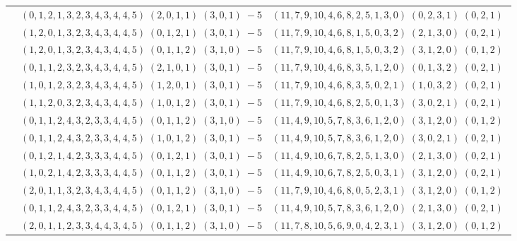 \documentclass[11pt]{article}
\begin{document}
\begin{longtable}[l]{|c|c|c|}
 \cline{2-3} 
 & $(0 ,1 ,2 ,1 ,3 ,2 ,3 ,4 ,3 ,4 ,4 ,5) \;(2 ,0 ,1 ,1) \;(3 ,0 ,1) \;-5$ & $(11 ,7 ,9 ,10 ,4 ,6 ,8 ,2 ,5 ,1 ,3 ,0) \;(0 ,2 ,3 ,1) \;(0 ,2 ,1) \;$\\ 
 \cline{2-3} 
 & $(1 ,2 ,0 ,1 ,3 ,2 ,3 ,4 ,3 ,4 ,4 ,5) \;(0 ,1 ,2 ,1) \;(3 ,0 ,1) \;-5$ & $(11 ,7 ,9 ,10 ,4 ,6 ,8 ,1 ,5 ,0 ,3 ,2) \;(2 ,1 ,3 ,0) \;(0 ,2 ,1) \;$\\ 
 \cline{2-3} 
 & $(1 ,2 ,0 ,1 ,3 ,2 ,3 ,4 ,3 ,4 ,4 ,5) \;(0 ,1 ,1 ,2) \;(3 ,1 ,0) \;-5$ & $(11 ,7 ,9 ,10 ,4 ,6 ,8 ,1 ,5 ,0 ,3 ,2) \;(3 ,1 ,2 ,0) \;(0 ,1 ,2) \;$\\ 
 \cline{2-3} 
 & $(0 ,1 ,1 ,2 ,3 ,2 ,3 ,4 ,3 ,4 ,4 ,5) \;(2 ,1 ,0 ,1) \;(3 ,0 ,1) \;-5$ & $(11 ,7 ,9 ,10 ,4 ,6 ,8 ,3 ,5 ,1 ,2 ,0) \;(0 ,1 ,3 ,2) \;(0 ,2 ,1) \;$\\ 
 \cline{2-3} 
 & $(1 ,0 ,1 ,2 ,3 ,2 ,3 ,4 ,3 ,4 ,4 ,5) \;(1 ,2 ,0 ,1) \;(3 ,0 ,1) \;-5$ & $(11 ,7 ,9 ,10 ,4 ,6 ,8 ,3 ,5 ,0 ,2 ,1) \;(1 ,0 ,3 ,2) \;(0 ,2 ,1) \;$\\ 
 \cline{2-3} 
 & $(1 ,1 ,2 ,0 ,3 ,2 ,3 ,4 ,3 ,4 ,4 ,5) \;(1 ,0 ,1 ,2) \;(3 ,0 ,1) \;-5$ & $(11 ,7 ,9 ,10 ,4 ,6 ,8 ,2 ,5 ,0 ,1 ,3) \;(3 ,0 ,2 ,1) \;(0 ,2 ,1) \;$\\ 
 \cline{2-3} 
 & $(0 ,1 ,1 ,2 ,4 ,3 ,2 ,3 ,3 ,4 ,4 ,5) \;(0 ,1 ,1 ,2) \;(3 ,1 ,0) \;-5$ & $(11 ,4 ,9 ,10 ,5 ,7 ,8 ,3 ,6 ,1 ,2 ,0) \;(3 ,1 ,2 ,0) \;(0 ,1 ,2) \;$\\ 
 \cline{2-3} 
 & $(0 ,1 ,1 ,2 ,4 ,3 ,2 ,3 ,3 ,4 ,4 ,5) \;(1 ,0 ,1 ,2) \;(3 ,0 ,1) \;-5$ & $(11 ,4 ,9 ,10 ,5 ,7 ,8 ,3 ,6 ,1 ,2 ,0) \;(3 ,0 ,2 ,1) \;(0 ,2 ,1) \;$\\ 
 \cline{2-3} 
 & $(0 ,1 ,2 ,1 ,4 ,2 ,3 ,3 ,3 ,4 ,4 ,5) \;(0 ,1 ,2 ,1) \;(3 ,0 ,1) \;-5$ & $(11 ,4 ,9 ,10 ,6 ,7 ,8 ,2 ,5 ,1 ,3 ,0) \;(2 ,1 ,3 ,0) \;(0 ,2 ,1) \;$\\ 
 \cline{2-3} 
 & $(1 ,0 ,2 ,1 ,4 ,2 ,3 ,3 ,3 ,4 ,4 ,5) \;(0 ,1 ,1 ,2) \;(3 ,0 ,1) \;-5$ & $(11 ,4 ,9 ,10 ,6 ,7 ,8 ,2 ,5 ,0 ,3 ,1) \;(3 ,1 ,2 ,0) \;(0 ,2 ,1) \;$\\ 
 \cline{2-3} 
 & $(2 ,0 ,1 ,1 ,3 ,2 ,3 ,4 ,3 ,4 ,4 ,5) \;(0 ,1 ,1 ,2) \;(3 ,1 ,0) \;-5$ & $(11 ,7 ,9 ,10 ,4 ,6 ,8 ,0 ,5 ,2 ,3 ,1) \;(3 ,1 ,2 ,0) \;(0 ,1 ,2) \;$\\ 
 \cline{2-3} 
 & $(0 ,1 ,1 ,2 ,4 ,3 ,2 ,3 ,3 ,4 ,4 ,5) \;(0 ,1 ,2 ,1) \;(3 ,0 ,1) \;-5$ & $(11 ,4 ,9 ,10 ,5 ,7 ,8 ,3 ,6 ,1 ,2 ,0) \;(2 ,1 ,3 ,0) \;(0 ,2 ,1) \;$\\ 
 \cline{2-3} 
 & $(2 ,0 ,1 ,1 ,2 ,3 ,3 ,4 ,4 ,3 ,4 ,5) \;(0 ,1 ,1 ,2) \;(3 ,1 ,0) \;-5$ & $(11 ,7 ,8 ,10 ,5 ,6 ,9 ,0 ,4 ,2 ,3 ,1) \;(3 ,1 ,2 ,0) \;(0 ,1 ,2) \;$\\ 

\end{longtable}
\end{document}
